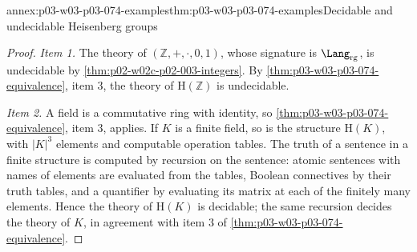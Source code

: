 \begin{annexitem}{annex:p03-w03-p03-074-examples}{thm:p03-w03-p03-074-examples}{Decidable and undecidable Heisenberg groups}
\begin{proof}
\emph{Item 1.} The theory of \((\mathbb Z,+,\cdot,0,1)\), whose signature
is \(\Lang_{\mathrm{rg}}\), is undecidable by
\cref{thm:p02-w02c-p02-003-integers}. By
\cref{thm:p03-w03-p03-074-equivalence}, item 3, the theory of
\(\mathrm H(\mathbb Z)\) is undecidable.

\emph{Item 2.} A field is a commutative ring with identity, so
\cref{thm:p03-w03-p03-074-equivalence}, item 3, applies. If \(K\) is a
finite field, so is the structure \(\mathrm H(K)\), with \(|K|^3\)
elements and computable operation tables. The truth of a sentence in a
finite structure is computed by recursion on the sentence: atomic
sentences with names of elements are evaluated from the tables, Boolean
connectives by their truth tables, and a quantifier by evaluating its
matrix at each of the finitely many elements. Hence the theory of
\(\mathrm H(K)\) is decidable; the same recursion decides the theory of
\(K\), in agreement with item 3 of
\cref{thm:p03-w03-p03-074-equivalence}.
\end{proof}
\end{annexitem}

